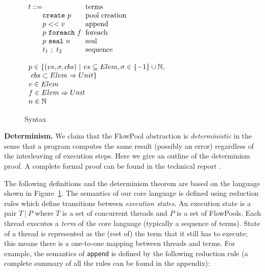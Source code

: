 \begin{figure}[t]


\begin{minipage}[b]{5 cm}
$\ba[t]{l@{\hspace{2mm}}l}
t    ::=                                                           & \mbox{terms}              \\
\gap \texttt{create}~p                                   & \mbox{pool creation}  \\
\gap p << v                                                  & \mbox{append}           \\
\gap p~\texttt{foreach}~f                             & \mbox{foreach}           \\
\gap p~\texttt{seal}~n                                  & \mbox{seal}                \\
\gap t_1~;~t_2                                               & \mbox{sequence}        \\
\ea$
\end{minipage}
\begin{minipage}[b]{7 cm}
$\ba[t]{l@{\hspace{2mm}}l}
p \in \set{(vs, \sigma, cbs)~|~vs \subseteq Elem, \sigma \in \set{-1} \cup \mathbb{N}, \\
\text{ } cbs \subset Elem \Rightarrow Unit} \\
v \in Elem \\
f \in Elem \Rightarrow Unit \\
n \in \mathbb{N}
\ea$
\end{minipage}


\caption{Syntax}\label{fig:syntax}
\end{figure}

\textbf{Determinism.}
We claim that the FlowPool abstraction is
\emph{deterministic} in the sense that a program computes the same
result (possibly an error) regardless of the interleaving of
execution steps. Here we give an outline of the determinism
proof. A complete formal proof can be found in the technical report
\cite{Prokopec12}.

The following definitions and the determinism theorem are based on the
language shown in Figure~\ref{fig:syntax}. The semantics of our core
language is defined using reduction rules which define transitions
between \emph{execution states}. An execution state is a pair $T~|~P$
where $T$ is a set of concurrent threads and $P$ is a set of
FlowPools. Each thread executes a \emph{term} of the core language
(typically a sequence of terms).
State of a thread is represented as the (rest of)
the term that it still has to execute; this means there is a
one-to-one mapping between threads and terms.
For example, the semantics of \verb|append| is defined by the
following reduction rule (a complete summary of all the rules can be
found in the appendix):


